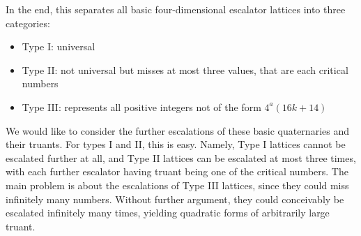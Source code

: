 \documentclass[letterpaper, 12pt]{article}
\begin{document}
In the end, this separates all basic four-dimensional escalator lattices into three categories:
\begin{itemize}
    \item Type I: universal
    \item Type II: not universal but misses at most three values, that are each critical numbers
    \item Type III: represents all positive integers not of the form $4^a(16k+14)$
\end{itemize}
We would like to consider the further escalations of these basic quaternaries and their truants.
For types I and II, this is easy.
Namely, Type I lattices cannot be escalated further at all, and Type II lattices can be escalated at most three times, with each further escalator having truant being one of the critical numbers.
The main problem is about the escalations of Type III lattices, since they could miss infinitely many numbers. Without further argument, they could conceivably be escalated infinitely many times, yielding quadratic forms of arbitrarily large truant.
\end{document}
